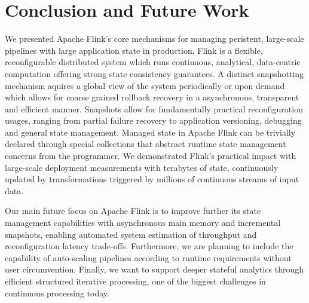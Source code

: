 
\section{Conclusion and Future Work}
\label{sec:conclusion}

We presented Apache Flink's core mechanisms for managing peristent, large-scale pipelines with large application state in production. Flink is a flexible, reconfigurable distributed system which runs continuous, analytical, data-centric computation offering strong state consistency guarantees. A distinct snapshotting mechanism aquires a global view of the system periodically or upon demand which allows for coarse grained rollback recovery in a asynchronous, transparent and efficient manner. Snapshots allow for fundamentally practical reconfiguration usages, ranging from partial failure recovery to application versioning, debugging and general state management. Managed state in Apache Flink can be trivially declared through special collections that abstract runtime state management concerns from the programmer. We demonstrated Flink's practical impact with large-scale deployment measurements with terabytes of state, continuously updated by transformations triggered by millions of continuous streams of input data.

Our main future focus on Apache Flink is to improve further its state management capabilities with asynchronous main memory and incremental snapshots, enabling automated system estimation of throughput and reconfiguration latency trade-offs. Furthermore, we are planning to include the capability of auto-scaling pipelines according to runtime requirements without user circumvention. Finally, we want to support deeper stateful analytics through efficient structured iterative processing, one of the biggest challenges in continuous processing today.